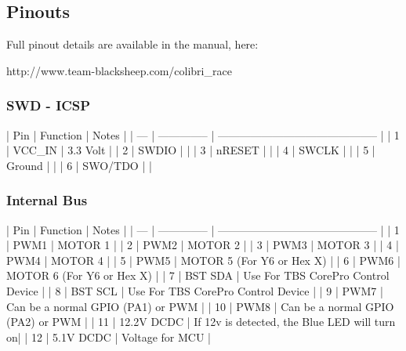 \subsection*{Pinouts}

\begin{DoxyVerb}Full pinout details are available in the manual, here:

http://www.team-blacksheep.com/colibri_race
\end{DoxyVerb}


\subsubsection*{S\+W\+D -\/ I\+C\+S\+P}

\begin{DoxyVerb}| Pin | Function       | Notes                                        |
| --- | -------------- | -------------------------------------------- |
| 1   | VCC_IN         | 3.3 Volt                                     |
| 2   | SWDIO          |                                              |
| 3   | nRESET         |                                              |
| 4   | SWCLK          |                                              |
| 5   | Ground         |                                              |
| 6   | SWO/TDO        |                                              |
\end{DoxyVerb}


\subsubsection*{Internal Bus}

\begin{DoxyVerb}| Pin | Function       | Notes                                        |
| --- | -------------- | -------------------------------------------- |
| 1   | PWM1           | MOTOR 1                                      |
| 2   | PWM2           | MOTOR 2                                      |
| 3   | PWM3           | MOTOR 3                                      |
| 4   | PWM4           | MOTOR 4                                      |
| 5   | PWM5           | MOTOR 5 (For Y6 or Hex X)                    |
| 6   | PWM6           | MOTOR 6 (For Y6 or Hex X)                    |
| 7   | BST SDA        | Use For TBS CorePro Control Device           |
| 8   | BST SCL        | Use For TBS CorePro Control Device           |
| 9   | PWM7           | Can be a normal GPIO (PA1) or PWM            |
| 10  | PWM8           | Can be a normal GPIO (PA2) or PWM            |
| 11  | 12.2V DCDC     | If 12v is detected, the Blue LED will turn on|
| 12  | 5.1V DCDC      | Voltage for MCU                              |
\end{DoxyVerb}


